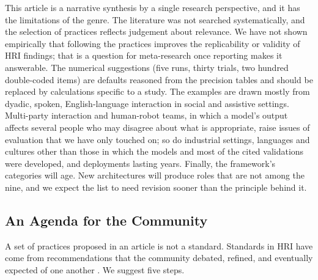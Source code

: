 This article is a narrative synthesis by a single research perspective, and
it has the limitations of the genre. The literature was not searched
systematically, and the selection of practices reflects judgement about
relevance. We have not shown empirically that following the practices
improves the replicability or validity of HRI findings; that is a question
for meta-research once reporting makes it answerable. The numerical
suggestions (five runs, thirty trials, two hundred double-coded items) are
defaults reasoned from the precision tables and should be replaced by
calculations specific to a study. The examples are drawn mostly from dyadic,
spoken, English-language interaction in social and assistive settings.
Multi-party interaction and human-robot teams, in which a model's output
affects several people who may disagree about what is appropriate, raise
issues of evaluation that we have only touched on; so do industrial settings,
languages and cultures other than those in which the models and most of the
cited validations were developed, and deployments lasting years. Finally,
the framework's categories will age. New architectures will produce roles
that are not among the nine, and we expect the list to need revision sooner
than the principle behind it.

\subsection{An Agenda for the Community}

A set of practices proposed in an article is not a standard. Standards in HRI
have come from recommendations that the community debated, refined, and
eventually expected of one another
\cite{riek2012wizard,baxter2016characterising,schrum2023concerning}. We
suggest five steps.

